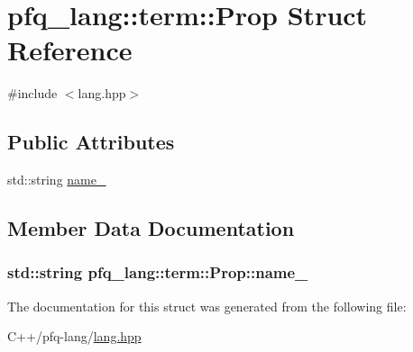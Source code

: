 \hypertarget{structpfq__lang_1_1term_1_1Prop}{\section{pfq\-\_\-lang\-:\-:term\-:\-:Prop Struct Reference}
\label{structpfq__lang_1_1term_1_1Prop}
}


{\ttfamily \#include $<$lang.\-hpp$>$}

\subsection*{Public Attributes}
\begin{DoxyCompactItemize}
\item 
std\-::string \hyperlink{structpfq__lang_1_1term_1_1Prop_acd5fa0f8edef688fe2f042557ae0056b}{name\-\_\-}
\end{DoxyCompactItemize}


\subsection{Member Data Documentation}
\hypertarget{structpfq__lang_1_1term_1_1Prop_acd5fa0f8edef688fe2f042557ae0056b}{
\subsubsection[{name\-\_\-}]{\setlength{\rightskip}{0pt plus 5cm}std\-::string pfq\-\_\-lang\-::term\-::\-Prop\-::name\-\_\-}}\label{structpfq__lang_1_1term_1_1Prop_acd5fa0f8edef688fe2f042557ae0056b}


The documentation for this struct was generated from the following file\-:\begin{DoxyCompactItemize}
\item 
C++/pfq-\/lang/\hyperlink{lang_8hpp}{lang.\-hpp}\end{DoxyCompactItemize}
